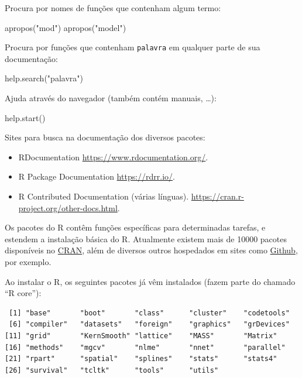 \documentclass[
  10pt,
  a4paper]{book}
\newenvironment{Shaded}{\begin{snugshade}}{\end{snugshade}}
\newcommand{\FunctionTok}[1]{\textcolor[rgb]{0.00,0.00,0.00}{#1}}
\newcommand{\NormalTok}[1]{#1}
\newcommand{\StringTok}[1]{\textcolor[rgb]{0.31,0.60,0.02}{#1}}
\providecommand{\tightlist}{%
  \setlength{\itemsep}{0pt}\setlength{\parskip}{0pt}}
\begin{document}
Procura por nomes de funções que contenham algum termo:

\begin{Shaded}
\begin{Highlighting}[]
\FunctionTok{apropos}\NormalTok{(}\StringTok{"mod"}\NormalTok{)}
\FunctionTok{apropos}\NormalTok{(}\StringTok{"model"}\NormalTok{)}
\end{Highlighting}
\end{Shaded}

Procura por funções que contenham \texttt{palavra} em qualquer parte de sua
documentação:

\begin{Shaded}
\begin{Highlighting}[]
\FunctionTok{help.search}\NormalTok{(}\StringTok{"palavra"}\NormalTok{)}
\end{Highlighting}
\end{Shaded}

Ajuda através do navegador (também contém manuais, \ldots):

\begin{Shaded}
\begin{Highlighting}[]
\FunctionTok{help.start}\NormalTok{()}
\end{Highlighting}
\end{Shaded}

Sites para busca na documentação dos diversos pacotes:

\begin{itemize}
\tightlist
\item
  RDocumentation \url{https://www.rdocumentation.org/}.
\item
  R Package Documentation \url{https://rdrr.io/}.
\item
  R Contributed Documentation (várias línguas).
  \url{https://cran.r-project.org/other-docs.html}.
\end{itemize}

Os pacotes do R contêm funções específicas para determinadas tarefas, e
estendem a instalação básica do R. Atualmente existem mais de 10000
pacotes disponíveis no
\href{http://cran-r.c3sl.ufpr.br/web/packages/index.html}{CRAN}, além de
diversos outros hospedados em sites como \href{https://github.com}{Github},
por exemplo.

Ao instalar o R, os seguintes pacotes já vêm instalados (fazem parte do
chamado ``R core''):

\begin{verbatim}
 [1] "base"       "boot"       "class"      "cluster"    "codetools" 
 [6] "compiler"   "datasets"   "foreign"    "graphics"   "grDevices" 
[11] "grid"       "KernSmooth" "lattice"    "MASS"       "Matrix"    
[16] "methods"    "mgcv"       "nlme"       "nnet"       "parallel"  
[21] "rpart"      "spatial"    "splines"    "stats"      "stats4"    
[26] "survival"   "tcltk"      "tools"      "utils"     
\end{verbatim}
\end{document}
